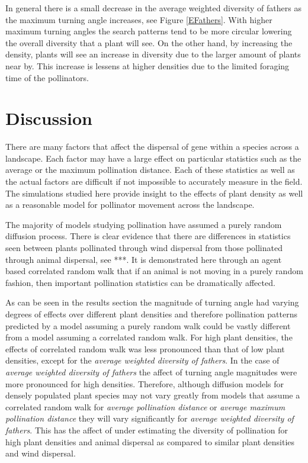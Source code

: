 \documentclass{tran-l}
\theoremstyle{definition}
\theoremstyle{remark}
\numberwithin{equation}{subsection}
\begin{document}
In general there is a small decrease in the average weighted diversity of fathers as the maximum turning angle increases, see Figure \ref{EFathers}. With higher maximum turning angles the search patterns tend to be more circular lowering the overall diversity that a plant will see.  On the other hand, by increasing the density, plants will see an increase in diversity due to the larger amount of plants near by.  This increase is lessens at higher densities due to the limited foraging time of the pollinators.



\section{{\bf Discussion}}
There are many factors that affect the dispersal of gene within a species across a landscape.  Each factor may have a large effect on particular statistics such as the average or the maximum pollination distance.  Each of these statistics as well as the actual factors are difficult if not impossible to accurately measure in the field.  The simulations studied here provide insight to the effects of plant density as well as a reasonable model for pollinator movement across the landscape.

The majority of models studying pollination have assumed a purely random
diffusion process. There is clear evidence that there are differences in statistics seen between plants pollinated through wind dispersal from those pollinated through animal dispersal, see ***.
It is demonstrated here through an agent based correlated random walk that if an animal is not moving in a purely random fashion, then important pollination statistics can be dramatically affected. 

As can be seen in the results section the magnitude of turning angle had varying
degrees of effects over different plant densities and therefore pollination
patterns predicted by a model assuming a purely random walk could be vastly
different from a model assuming a correlated random walk. For high plant
densities, the effects of correlated random walk was less pronounced than that of
low plant densities, except for the \emph{average weighted diversity of
fathers}. In the case of \emph{average weighted diversity of fathers} the affect
of turning angle magnitudes were more pronounced for high densities. Therefore,
although diffusion models for densely populated plant species may not vary
greatly from models that assume a correlated random walk for \emph{average
pollination distance} or \emph{average maximum pollination distance} they will
vary significantly for \emph{average weighted diversity of fathers}. This has
the affect of under estimating the diversity of pollination for high plant
densities and animal dispersal as compared to similar plant densities and wind
dispersal.
\end{document}

